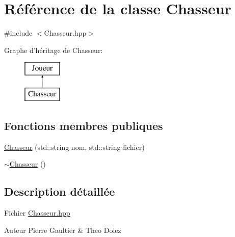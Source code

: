 \hypertarget{class_chasseur}{\section{\-Référence de la classe \-Chasseur}
\label{class_chasseur}
}


{\ttfamily \#include $<$\-Chasseur.\-hpp$>$}

\-Graphe d'héritage de \-Chasseur\-:\begin{figure}[H]
\begin{center}
\leavevmode
\includegraphics[height=2.000000cm]{class_chasseur}
\end{center}
\end{figure}
\subsection*{\-Fonctions membres publiques}
\begin{DoxyCompactItemize}
\item 
\hyperlink{class_chasseur_af4bca087f4380663c19cd91cf373cf50}{\-Chasseur} (std\-::string nom, std\-::string fichier)
\item 
\hyperlink{class_chasseur_a0a2966005d679a141a3da9beeba165fc}{$\sim$\-Chasseur} ()
\end{DoxyCompactItemize}


\subsection{\-Description détaillée}
\-Fichier \hyperlink{_chasseur_8hpp}{\-Chasseur.\-hpp} \begin{DoxyAuthor}{\-Auteur}
\-Pierre \-Gaultier \& \-Theo \-Dolez 
\end{DoxyAuthor}



